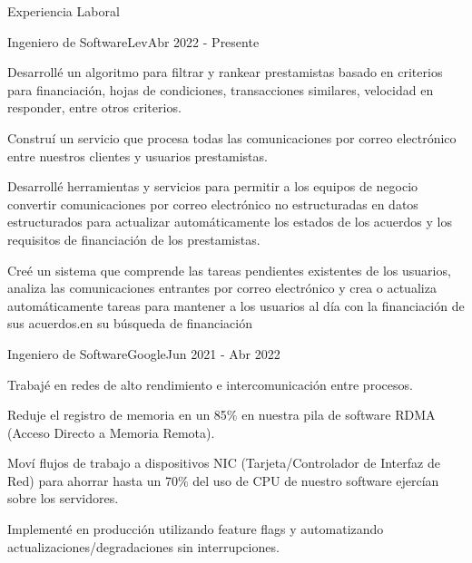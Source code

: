\documentclass{resume} %
\begin{document}
	
	
	\begin{rSection}{Experiencia Laboral}
		
		\begin{rSubsection}{Ingeniero de Software}{Lev}{}{Abr 2022 - Presente}
			\item Desarrollé un algoritmo para filtrar y rankear prestamistas basado en criterios para financiación, hojas de condiciones, transacciones similares, velocidad en responder, entre otros criterios.
			\item Construí un servicio que procesa todas las comunicaciones por correo electrónico entre nuestros clientes y usuarios prestamistas.
			\item Desarrollé herramientas y servicios para permitir a los equipos de negocio convertir comunicaciones por correo electrónico no estructuradas en datos estructurados para actualizar automáticamente los estados de los acuerdos y los requisitos de financiación de los prestamistas.
			\item Creé un sistema que comprende las tareas pendientes existentes de los usuarios, analiza las comunicaciones entrantes por correo electrónico y crea o actualiza automáticamente tareas para mantener a los usuarios al día con la financiación de sus acuerdos.en su búsqueda de financiación
		\end{rSubsection}
		
		
		\begin{rSubsection}{Ingeniero de Software}{Google}{}{Jun 2021 - Abr 2022}
			\item Trabajé en redes de alto rendimiento e intercomunicación entre procesos.
			\item Reduje el registro de memoria en un 85\% en nuestra pila de software RDMA (Acceso Directo a Memoria Remota).
			\item Moví flujos de trabajo a dispositivos NIC (Tarjeta/Controlador de Interfaz de Red) para ahorrar hasta un 70\% del uso de CPU de nuestro software ejercían sobre los servidores.
			\item Implementé en producción utilizando feature flags y automatizando actualizaciones/degradaciones sin interrupciones.
		\end{rSubsection}
		

\end{rSection}
\end{document}
